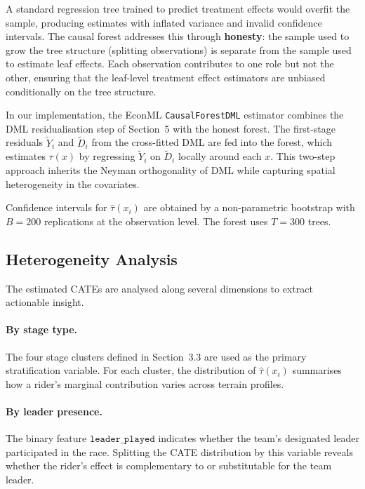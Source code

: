 A standard regression tree trained to predict treatment effects would overfit the sample, producing estimates with inflated variance and invalid confidence intervals. The causal forest addresses this through \textbf{honesty}: the sample used to grow the tree structure (splitting observations) is separate from the sample used to estimate leaf effects. Each observation contributes to one role but not the other, ensuring that the leaf-level treatment effect estimators are unbiased conditionally on the tree structure.

In our implementation, the EconML \texttt{CausalForestDML} estimator combines the DML residualisation step of Section~5 with the honest forest. The first-stage residuals $\tilde{Y}_i$ and $\tilde{D}_i$ from the cross-fitted DML are fed into the forest, which estimates $\tau(x)$ by regressing $\tilde{Y}_i$ on $\tilde{D}_i$ locally around each $x$. This two-step approach inherits the Neyman orthogonality of DML while capturing spatial heterogeneity in the covariates.

Confidence intervals for $\hat{\tau}(x_i)$ are obtained by a non-parametric bootstrap with $B = 200$ replications at the observation level. The forest uses $T = 300$ trees.

\subsection{Heterogeneity Analysis}

The estimated CATEs are analysed along several dimensions to extract actionable insight.

\paragraph{By stage type.} The four stage clusters defined in Section~3.3 are used as the primary stratification variable. For each cluster, the distribution of $\hat{\tau}(x_i)$ summarises how a rider's marginal contribution varies across terrain profiles.

\paragraph{By leader presence.} The binary feature $\texttt{leader\_played}$ indicates whether the team's designated leader participated in the race. Splitting the CATE distribution by this variable reveals whether the rider's effect is complementary to or substitutable for the team leader.

